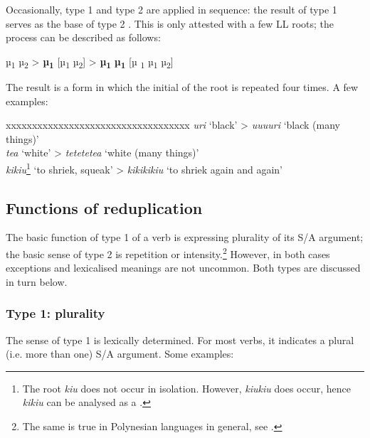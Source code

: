 Occasionally, type 1 and type 2  are applied in sequence: the result of type 1  serves as the base of type 2 . This is only attested with a few LL roots; the process can be described as follows:

\ea
  µ\textsubscript{1} µ\textsubscript{2} > \textbf{µ}\textbf{\textsubscript{1}} [µ\textsubscript{1} µ\textsubscript{2}] > \textbf{µ}\textbf{\textsubscript{1}} \textbf{µ}\textbf{\textsubscript{1}} [µ\textsubscript{ 1} µ\textsubscript{1} µ\textsubscript{2}]
\z

The result is a form in which the initial  of the root is repeated four times. A few examples:

\ea
\begin{tabbing}
 xxxxxxxxxxxxxxxxxxxxxxxxxxxxxxxxxxx \kill
\textit{{\ꞌ}uri} ‘black’ > \textit{{\ꞌ}u{\ꞌ}u{\ꞌ}u{\ꞌ}uri} ‘black (many things)’\\
  \textit{tea} ‘white’ > \textit{tetetetea} ‘white (many things)’\\
  \textit{kikiu}\footnote{\label{fn:80}The root \textit{kiu} does not occur in isolation. However, \textit{kiukiu} does occur, hence \textit{kikiu} can be analysed as a .} ‘to shriek, squeak’ > \textit{kikikikiu} ‘to shriek again and again’
\end{tabbing}
\z 
\subsection{Functions of reduplication}\label{sec:2.6.2}
The basic function of type 1  of a verb is expressing plurality of its S/A argument; the basic sense of type 2  is repetition or intensity.\footnote{\label{fn:81}The same is true in Polynesian languages in general, see \citet{Finney1999}.} However, in both cases exceptions and lexicalised meanings are not uncommon. Both types are discussed in turn below.

\subsubsection[Type 1: plurality]{Type 1: plurality}\label{sec:2.6.2.1}

The sense of type 1  is lexically determined. For most verbs, it indicates a plural (i.e. more than one) S/A argument. Some examples:

